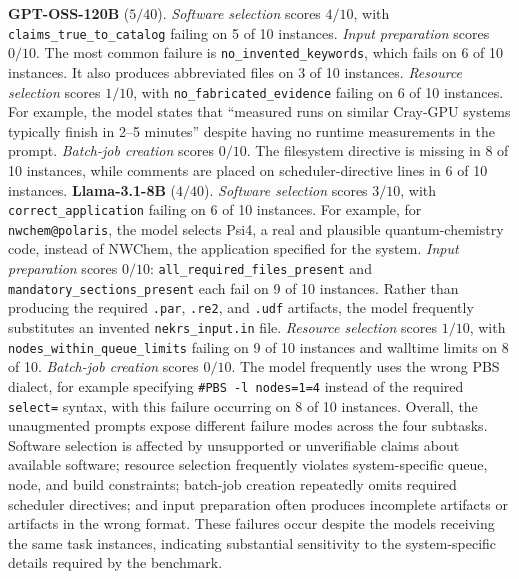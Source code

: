 \documentclass[conference]{IEEEtran}
\begin{document}
\textbf{GPT-OSS-120B} ($5/40$).
\emph{Software selection} scores $4/10$, with \texttt{claims\_true\_to\_catalog} failing on 5 of 10 instances. \emph{Input preparation} scores $0/10$. The most common failure is \texttt{no\_invented\_keywords}, which fails on 6 of 10 instances. It also produces abbreviated files on 3 of 10 instances. \emph{Resource selection} scores $1/10$, with \texttt{no\_fabricated\_evidence} failing on 6 of 10 instances. For example, the model states that ``measured runs on similar Cray-GPU systems typically finish in 2--5 minutes'' despite having no runtime measurements in the prompt. \emph{Batch-job creation} scores $0/10$. The filesystem directive is missing in 8 of 10 instances, while comments are placed on scheduler-directive lines in 6 of 10 instances.
\textbf{Llama-3.1-8B} ($4/40$).
\emph{Software selection} scores $3/10$, with \texttt{correct\_application} failing on 6 of 10 instances. For example, for \texttt{nwchem@polaris}, the model selects Psi4, a real and plausible quantum-chemistry code, instead of NWChem, the application specified for the system. \emph{Input preparation} scores $0/10$: \texttt{all\_required\_files\_present} and \texttt{mandatory\_sections\_present} each fail on 9 of 10 instances. Rather than producing the required \texttt{.par}, \texttt{.re2}, and \texttt{.udf} artifacts, the model frequently substitutes an invented \texttt{nekrs\_input.in} file. \emph{Resource selection} scores $1/10$, with \texttt{nodes\_within\_queue\_limits} failing on 9 of 10 instances and walltime limits on 8 of 10. \emph{Batch-job creation} scores $0/10$. The model frequently uses the wrong PBS dialect, for example specifying \texttt{\#PBS -l nodes=1=4} instead of the required \texttt{select=} syntax, with this failure occurring on 8 of 10 instances.
Overall, the unaugmented prompts expose different failure modes across the four subtasks. Software selection is affected by unsupported or unverifiable claims about available software; resource selection frequently violates system-specific queue, node, and build constraints; batch-job creation repeatedly omits required scheduler directives; and input preparation often produces incomplete artifacts or artifacts in the wrong format. These failures occur despite the models receiving the same task instances, indicating substantial sensitivity to the system-specific details required by the benchmark.
\end{document}
